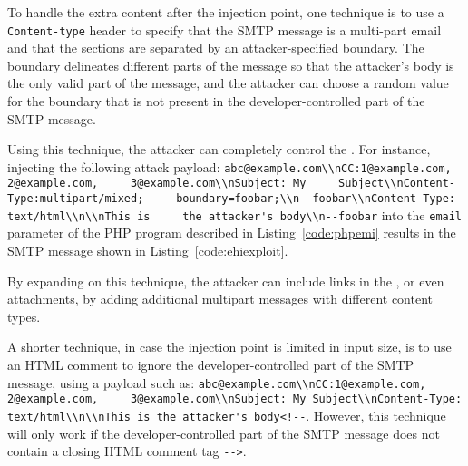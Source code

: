 To handle the extra content after the injection point, one technique
is to use a \texttt{Content-type} header to specify that the SMTP
message is a multi-part email and that the sections are separated by
an attacker-specified boundary. The boundary delineates different
parts of the message so that the attacker's body is the only valid
part of the message, and the attacker can choose a random value for
the boundary that is not present in the developer-controlled part of
the SMTP message.

Using this technique, the attacker can completely control the \email.
For instance, injecting the following attack payload:
\texttt{\lstinline{abc@example.com\\nCC:1@example.com, 2@example.com,
    3@example.com\\nSubject: My
    Subject\\nContent-Type:multipart/mixed;
    boundary=foobar;\\n--foobar\\nContent-Type: text/html\\n\\nThis is
    the attacker's body\\n--foobar}} into the \texttt{email} parameter
of the PHP program described in Listing~\ref{code:phpemi} results in
the SMTP message shown in Listing~\ref{code:ehiexploit}.

By expanding on this technique, the attacker can include links in the
\email, or even attachments, by adding additional multipart messages
with different content types.

A shorter technique, in case the injection point is limited in input
size, is to use an HTML comment to ignore the developer-controlled
part of the SMTP message, using a payload such as:
\texttt{\lstinline{abc@example.com\\nCC:1@example.com, 2@example.com,
    3@example.com\\nSubject: My Subject\\nContent-Type:
    text/html\\n\\nThis is the attacker's body<!--}}. However, this
technique will only work if the developer-controlled part of the SMTP
message does not contain a closing HTML comment tag
\texttt{\lstinline{-->}}.

